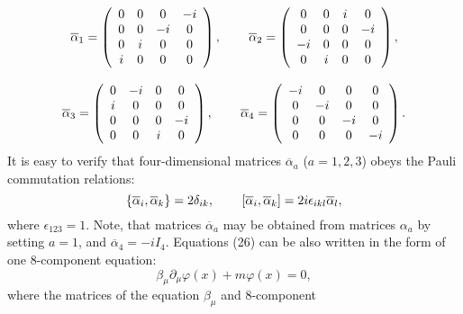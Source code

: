 \documentclass[a4paper,12pt]{article}
\begin{document}
\[
\overline{\alpha } _1=\left(
\begin{array}{cccc}
0 & 0 & 0 & -i \\
0 & 0 & -i & 0 \\
0 & i & 0 & 0 \\
i & 0 & 0 & 0
\end{array}
\right) ,\hspace{0.3in}\overline{\alpha } _2=\left(
\begin{array}{cccc}
0 & 0 & i & 0 \\
0 & 0 & 0 & -i \\
-i & 0 & 0 & 0 \\
0 & i & 0 & 0
\end{array}
\right) ,
\]
\vspace{-7mm}
\begin{equation}
\label{28}
\end{equation}
\vspace{-7mm}
\[
\overline{\alpha } _3=\left(
\begin{array}{cccc}
0 & -i & 0 & 0 \\
i & 0 & 0 & 0 \\
0 & 0 & 0 & -i \\
0 & 0 & i & 0
\end{array}
\right) ,\hspace{0.3in}\overline{\alpha }_4=\left(
\begin{array}{cccc}
-i & 0 & 0 & 0 \\
0 & -i & 0 & 0 \\
0 & 0 & -i & 0 \\
0 & 0 & 0 & -i
\end{array}
\right) .
\]
It is easy to verify that four-dimensional matrices
$\overline{\alpha }_a$ ($a=1,2,3$) obeys the Pauli commutation
relations:
\begin{equation}
\left\{ \overline{\alpha } _i,\overline{\alpha } _k\right\}
=2\delta _{ik} ,\hspace{0.3in} \left[ \overline{\alpha }
_i,\overline{\alpha } _k\right] =2i\epsilon _{ikl}\overline{\alpha
} _l ,\label{29}
\end{equation}
where $\epsilon _{123}=1$. Note, that matrices $\overline{\alpha
}_a$ may be obtained from matrices $\alpha _a$ by setting $a=1$,
and $\overline{\alpha }_4=-iI_4$. Equations (26) can be also
written in the form of one 8-component equation:
\begin{equation}
\beta _\mu \partial _\mu \varphi (x)+m\varphi (x)=0 ,  \label{30}
\end{equation}
where the matrices of the equation $\beta _\mu$ and 8-component
\end{document}
